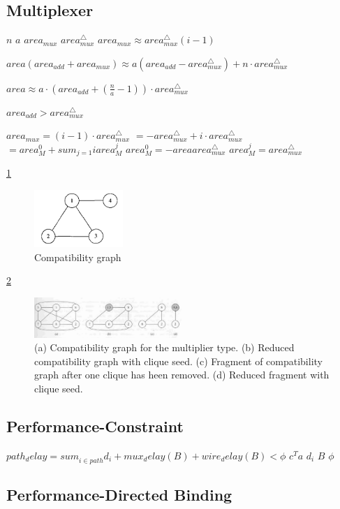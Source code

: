 \subsection{Multiplexer}
$ n $
$ a $
$ area_{mux} $
$ area_{mux}^{\bigtriangleup} $
$area_{mux} \approx area_{mux}^{\bigtriangleup}(i-1) $

$ area(area_{add}+area_{mux})\approx a(area_{add}- area_{mux}^{\bigtriangleup})+n \cdot area_{mux}^{\bigtriangleup}  $

$ area\approx a\cdot (area_{add}+(\frac{n}{a}-1)) \cdot area_{mux}^{\bigtriangleup} $

$ area_{add} > area_{mux}^{\bigtriangleup} $


$area_{mux} = (i-1)\cdot area_{mux}^{\bigtriangleup} $
$=-area_{mux}^{\bigtriangleup} + i \cdot area_{mux}^{\bigtriangleup}  $
$=area_{M}^{0} + sum_{j=1}{i} area_{M}^{j}$
$ area_{M}^{0} = -areaarea_{mux}^{\bigtriangleup} $
$ area_{M}^{j}=area_{mux}^{\bigtriangleup} $


\ref{fig:Comparibility_graph_mux}
\begin{figure}[h]
    \centering
    \includegraphics[width=0.3\textwidth]{Comparibility_graph_mux}
    \caption{ Compatibility graph \cite{b1}}
    \label{fig:Comparibility_graph_mux}
\end{figure}

\ref{fig:Comparibility_graph_mux_2}
\begin{figure}[h]
    \centering
    \includegraphics[width=0.5\textwidth]{Comparibility_graph_mux_2}
    \caption{ (a) Compatibility graph for the multiplier type. (b) Reduced compatibility graph with clique seed. (c) Fragment of compatibility graph after one clique has heen removed. (d) Reduced fragment with clique seed. \cite{b1}}
    \label{fig:Comparibility_graph_mux_2}
\end{figure}

\subsection{Performance-Constraint}

$ path_delay=sum_{i \in path}^{}d_{i} + mux_delay(B)+wire_delay(B)< \phi $
$ c^{T}a $
$ d_{i} $
$ B $
$ \phi $

\subsection{Performance-Directed Binding}

%	
%	
